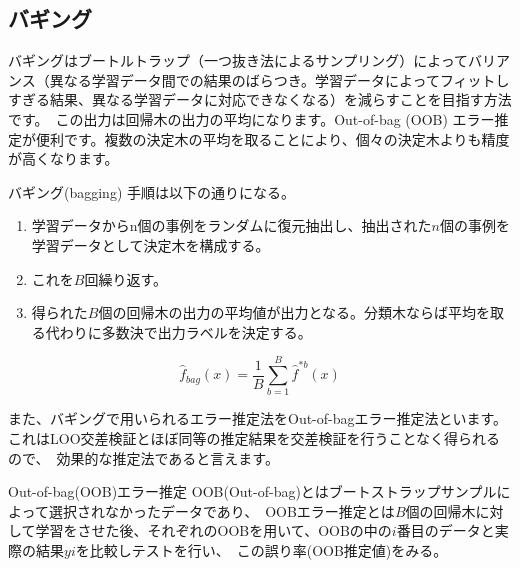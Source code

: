 \documentclass[uplatex]{jsarticle}
\begin{document}
\subsection{バギング}
バギングはブートルトラップ（一つ抜き法によるサンプリング）によってバリアンス（異なる学習データ間での結果のばらつき。学習データによってフィットしすぎる結果、異なる学習データに対応できなくなる）を減らすことを目指す方法です。\
この出力は回帰木の出力の平均になります。Out-of-bag (OOB) エラー推定が便利です。複数の決定木の平均を取ることにより、個々の決定木よりも精度が高くなります。
\begin{itembox}[l]{バギング(bagging)}
  手順は以下の通りになる。
    \begin{enumerate}
      \item 学習データからn個の事例をランダムに復元抽出し、抽出された$n$個の事例を学習データとして決定木を構成する。
      \item これを$B$回繰り返す。
      \item 得られた$B$個の回帰木の出力の平均値が出力となる。分類木ならば平均を取る代わりに多数決で出力ラベルを決定する。
    \end{enumerate}
    $$\hat{f}_{bag}(x) = \frac{1}{B}\sum_{b=1}^B \hat{f}^{*b}(x)$$
\end{itembox}
また、バギングで用いられるエラー推定法をOut-of-bagエラー推定法といます。これはLOO交差検証とほぼ同等の推定結果を交差検証を行うことなく得られるので、\
効果的な推定法であると言えます。
\begin{itembox}[l]{Out-of-bag(OOB)エラー推定}
  OOB(Out-of-bag)とはブートストラップサンプルによって選択されなかったデータであり、\
  OOBエラー推定とは$B$個の回帰木に対して学習をさせた後、それぞれのOOBを用いて、OOBの中の$i$番目のデータと実際の結果$yi$を比較しテストを行い、\
  この誤り率(OOB推定値)をみる。
\end{itembox}
\end{document}
